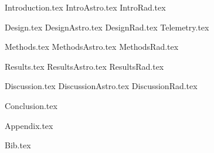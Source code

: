 \documentclass[aps,superscriptaddress,floatfix,nofootinbib,showpacs,amsmath,amssymb,altaffilletter,floatfix,onecolumn]{revtex4-1}
\begin{document}
{Introduction.tex}
{IntroAstro.tex}
{IntroRad.tex}

{Design.tex}
{DesignAstro.tex}
{DesignRad.tex}
{Telemetry.tex}

{Methods.tex}
{MethodsAstro.tex}
{MethodsRad.tex}

{Results.tex} 
{ResultsAstro.tex} 
{ResultsRad.tex} 

{Discussion.tex}
{DiscussionAstro.tex}
{DiscussionRad.tex}

{Conclusion.tex} 
\newpage

{Appendix.tex}
\newpage

{Bib.tex}

\clearpage

\end{document}
